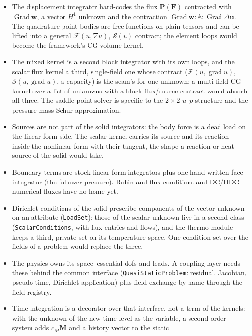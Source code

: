 \documentclass[11pt]{article}
\newcommand{\Grad}{\operatorname{Grad}}
\newcommand{\grad}{\operatorname{grad}}
\newcommand{\bu}{\bm{u}}
\newcommand{\bw}{\bm{w}}
\newcommand{\bP}{\bm{P}}
\newcommand{\bF}{\bm{F}}
\newcommand{\bA}{\mathbb{A}}
\newcommand{\bM}{\bm{M}}
\DeclareRobustCommand{\code}[1]{{\def\_{\textunderscore\allowbreak}\texttt{#1}}}
\begin{document}
\begin{itemize}[nosep]
  \item The displacement integrator hard-codes the flux $\bP(\bF)$
    contracted with $\Grad\bw$, a vector $H^1$ unknown and the contraction
    $\Grad\bw:\bA:\Grad\Delta\bu$.  The quadrature-point bodies are free
    functions on plain tensors and can be lifted into a general
    $\bm{\mathcal F}(u, \nabla u)$, $\mathcal S(u)$ contract; the element
    loops would become the framework's CG volume kernel.
  \item The mixed kernel is a second block integrator with its own loops,
    and the scalar flux kernel a third, single-field one whose contract
    ($\bm{\mathcal F}(u, \grad u)$, $\mathcal S(u, \grad u)$, a capacity)
    is the seam's for one unknown; a multi-field CG kernel over a list of
    unknowns with a block flux/source contract would absorb all three.  The
    saddle-point solver is specific to the $2\times2$ $u$--$p$ structure and
    the pressure-mass Schur approximation.
  \item Sources are not part of the solid integrators: the body force is a
    dead load on the linear-form side.  The scalar kernel carries its
    source and its reaction inside the nonlinear form with their tangent,
    the shape a reaction or heat source of the solid would take.
  \item Boundary terms are stock linear-form integrators plus one
    hand-written face integrator (the follower pressure).  Robin and flux
    conditions and DG/HDG numerical fluxes have no home yet.
  \item Dirichlet conditions of the solid prescribe components of the
    vector unknown on an attribute (\code{LoadSet}); those of the scalar
    unknown live in a second class (\code{ScalarConditions}, with flux
    entries and flows), and the thermo module keeps a third, private set
    on its temperature space.  One condition set over the fields of a
    problem would replace the three.
  \item The physics owns its space, essential dofs and loads.  A coupling
    layer needs these behind the common interface (\code{QuasiStaticProblem}:
    residual, Jacobian, pseudo-time, Dirichlet application) plus field
    exchange by name through the field registry.
  \item Time integration is a decorator over that interface, not a term of
    the kernels: with the unknown of the new time level as the variable,
    a second-order system adds $c_M\bM$ and a history vector to the static

\end{itemize}
\end{document}
